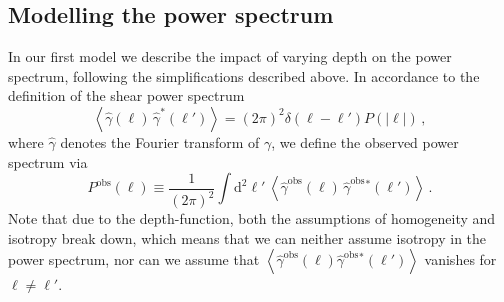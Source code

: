 \documentclass{aa}
\renewcommand{\rm}{\mathrm}
\def\b#1{\bm{#1}}
\def\la{\left<}
\def\ra{\right>}
\def\gammaoh{\hat{\gamma}^{\text{obs}}}
\def\d{\rm{d}}
\begin{document}
\subsection{Modelling the power spectrum}
\label{sec:modelling_power_spectrum}
In our first model we describe the impact of varying depth on the power spectrum, following the simplifications described above.
%
%
In accordance to the definition of the shear power spectrum \begin{equation}
\la \hat{\gamma}(\b\ell)\,\hat{\gamma}^*(\b\ell')\ra = (2\pi)^2\delta(\b\ell-\b\ell')P(|\b\ell|) \, ,
\label{eq:original_power_spectrum}
\end{equation}
where $\hat{\gamma}$ denotes the Fourier transform of $\gamma$, we define the observed power spectrum via \begin{equation}
P^{\text{obs}}(\b\ell) \equiv \frac{1}{(2\pi)^2}\int \d^2 \ell'\,  \la \gammaoh(\b \ell)\, \gammaoh {}^*(\b \ell')\ra \, .
\end{equation}
Note that due to the depth-function, both the assumptions of homogeneity and isotropy break down, which means that we can neither assume isotropy in the power spectrum, nor can we assume that $\la \gammaoh(\b \ell) \gammaoh {}^*(\b \ell')\ra$ vanishes for $\b\ell\neq\b\ell'$.
\end{document}
